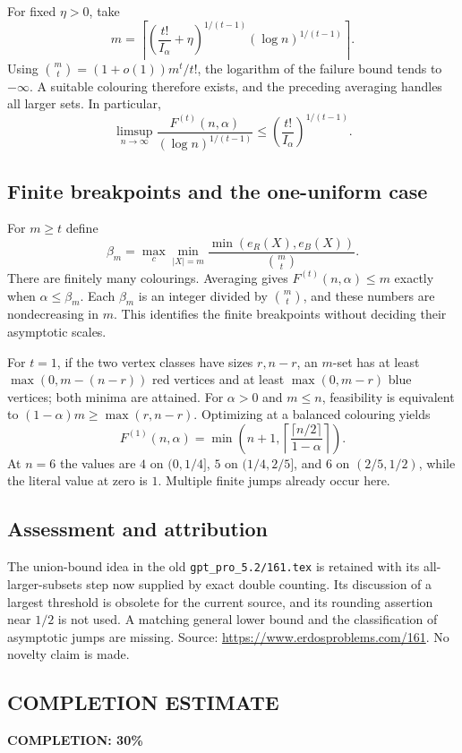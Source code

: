 For fixed $\eta>0$, take
\[
 m=\left\lceil
 \left(\frac{t!}{I_\alpha}+\eta\right)^{1/(t-1)}
 (\log n)^{1/(t-1)}\right\rceil.
\]
Using $\binom mt=(1+o(1))m^t/t!$, the logarithm of the failure bound tends to $-\infty$. A suitable colouring therefore exists, and the preceding averaging handles all larger sets. In particular,
\[
 \limsup_{n\to\infty}\frac{F^{(t)}(n,\alpha)}
 {(\log n)^{1/(t-1)}}
 \le\left(\frac{t!}{I_\alpha}\right)^{1/(t-1)}.
\]

\subsection*{Finite breakpoints and the one-uniform case}
For $m\ge t$ define
\[
 \beta_m=\max_c\min_{|X|=m}
 \frac{\min(e_R(X),e_B(X))}{\binom mt}.
\]
There are finitely many colourings. Averaging gives
$F^{(t)}(n,\alpha)\le m$ exactly when $\alpha\le\beta_m$.
Each $\beta_m$ is an integer divided by $\binom mt$, and these numbers are nondecreasing in $m$. This identifies the finite breakpoints without deciding their asymptotic scales.

For $t=1$, if the two vertex classes have sizes $r,n-r$, an $m$-set has at least $\max(0,m-(n-r))$ red vertices and at least $\max(0,m-r)$ blue vertices; both minima are attained. For $\alpha>0$ and $m\le n$, feasibility is equivalent to
$(1-\alpha)m\ge\max(r,n-r)$. Optimizing at a balanced colouring yields
\[
 F^{(1)}(n,\alpha)=
 \min\left(n+1,\left\lceil
 \frac{\lceil n/2\rceil}{1-\alpha}\right\rceil\right).
\]
At $n=6$ the values are $4$ on $(0,1/4]$, $5$ on $(1/4,2/5]$, and $6$ on $(2/5,1/2)$, while the literal value at zero is $1$. Multiple finite jumps already occur here.

\subsection*{Assessment and attribution}
The union-bound idea in the old \texttt{gpt\_pro\_5.2/161.tex} is retained with its all-larger-subsets step now supplied by exact double counting. Its discussion of a largest threshold is obsolete for the current source, and its rounding assertion near $1/2$ is not used. A matching general lower bound and the classification of asymptotic jumps are missing. Source: \url{https://www.erdosproblems.com/161}. No novelty claim is made.
\subsection*{COMPLETION ESTIMATE}
\textbf{COMPLETION: 30\%}

